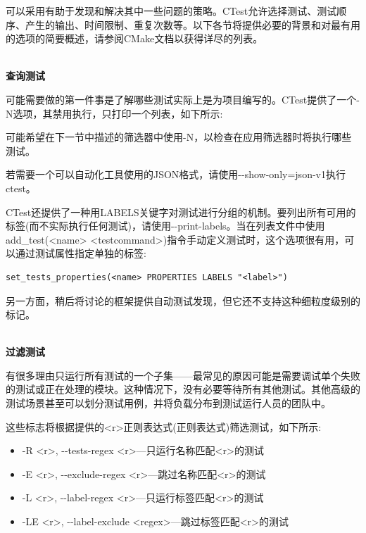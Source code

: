 可以采用有助于发现和解决其中一些问题的策略。CTest允许选择测试、测试顺序、产生的输出、时间限制、重复次数等。以下各节将提供必要的背景和对最有用的选项的简要概述，请参阅CMake文档以获得详尽的列表。

\hspace*{\fill} \\ %
\noindent
\textbf{查询测试}

可能需要做的第一件事是了解哪些测试实际上是为项目编写的。CTest提供了一个-N选项，其禁用执行，只打印一个列表，如下所示:


可能希望在下一节中描述的筛选器中使用-N，以检查在应用筛选器时将执行哪些测试。

若需要一个可以自动化工具使用的JSON格式，请使用-{}-show-only=json-v1执行ctest。

CTest还提供了一种用LABELS关键字对测试进行分组的机制。要列出所有可用的标签(而不实际执行任何测试)，请使用-{}-print-labels。当在列表文件中使用add\_test(<name> <testcommand>)指令手动定义测试时，这个选项很有用，可以通过测试属性指定单独的标签:

\begin{lstlisting}[style=styleCMake]
set_tests_properties(<name> PROPERTIES LABELS "<label>")
\end{lstlisting} 

另一方面，稍后将讨论的框架提供自动测试发现，但它还不支持这种细粒度级别的标记。

\hspace*{\fill} \\ %
\noindent
\textbf{过滤测试}

有很多理由只运行所有测试的一个子集——最常见的原因可能是需要调试单个失败的测试或正在处理的模块。这种情况下，没有必要等待所有其他测试。其他高级的测试场景甚至可以划分测试用例，并将负载分布到测试运行人员的团队中。

这些标志将根据提供的<r>正则表达式(正则表达式)筛选测试，如下所示:

\begin{itemize}
\item 
-R <r>, -{}-tests-regex <r>—只运行名称匹配<r>的测试

\item 
-E <r>, -{}-exclude-regex <r>—跳过名称匹配<r>的测试

\item 
-L <r>, -{}-label-regex <r>—只运行标签匹配<r>的测试

\item 
-LE <r>, -{}-label-exclude <regex>—跳过标签匹配<r>的测试
\end{itemize}

